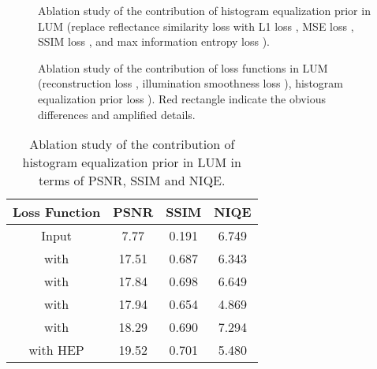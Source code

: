 \documentclass[journal]{IEEEtran}
\begin{document}
\begin{figure*}[t]
\centering
    \hspace*{-2mm}
    \hspace*{-2mm}
    \hspace*{-2mm}
    \hspace*{-2mm}
    \hspace*{-2mm}
 \caption{Ablation study of the contribution of histogram equalization prior in LUM (replace reflectance similarity loss  with L1 loss , MSE loss , SSIM loss , and max information entropy loss ).}
 \label{Figure prior}
\end{figure*}
\begin{figure*}[htbp]
\centering
    \hspace*{-2mm}
    \hspace*{-2mm}
    \hspace*{-2mm}
    \hspace*{-2mm}
 \caption{Ablation study of the contribution of loss functions in LUM (reconstruction loss , illumination smoothness loss ), histogram equalization prior loss ). Red rectangle indicate the obvious differences and amplified details.}
 \label{Figure abs1loss}
\end{figure*}

\begin{table}[t]
\centering
\caption{Ablation study of the contribution of histogram equalization prior in LUM in terms of PSNR, SSIM and NIQE.}
\begin{tabular}{c|c|c|c}
\hline
\textbf{Loss Function} & \textbf{PSNR} & \textbf{SSIM} & \textbf{NIQE} \\ \hline
Input &7.77 &0.191 &6.749\\ 
with  &17.51 &0.687 &6.343\\ 
with  &17.84 &0.698 &6.649\\ 
with  &17.94 &0.654 &4.869\\ 
with  &18.29 &0.690 &7.294\\ 
with HEP &19.52 &0.701 &5.480\\ \hline
\end{tabular}
\label{table:prior}
\end{table}
\end{document}
